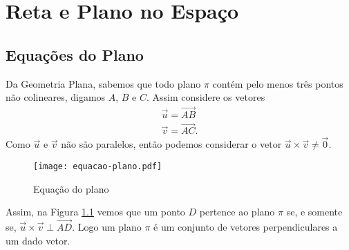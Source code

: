 
\chapter{Reta e Plano no Espa\c{c}o} %
\label{cha:reta_e_plano_no_espaco}

\section{Equa\c{c}\~oes do Plano} %
\label{sec:equacoes_do_plano}

Da Geometria Plana, sabemos que todo plano $\pi$ cont\'em pelo menos tr\^es pontos n\~ao colineares, digamos $A$, $B$ e $C$. Assim considere os vetores
\begin{align*}
    \vec{u} = \vec{AB}\\
    \vec{v} = \vec{AC}.
\end{align*}
Como $\vec{u}$ e $\vec{v}$ n\~ao s\~ao paralelos, ent\~ao podemos considerar o vetor $\vec{u}\times\vec{v}\ne \vec{0}$.
\begin{figure}[!h]
    \centering
    \caption{Equa\c{c}\~ao do plano}\label{definicao-plano}
    \texttt{[image: equacao-plano.pdf]}


        
\end{figure}
Assim, na Figura \ref{definicao-plano} vemos que um ponto $D$ pertence ao plano $\pi$ se, e somente se, $\vec{u}\times\vec{v} \perp \vec{AD}$. Logo um plano $\pi$ \'e um conjunto de vetores perpendiculares a um dado vetor.

